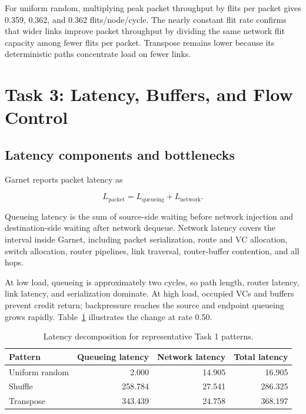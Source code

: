 \documentclass[11pt,a4paper]{article}
\begin{document}
For uniform random, multiplying peak packet throughput by flits per packet
gives 0.359, 0.362, and 0.362 flits/node/cycle. The nearly constant flit rate
confirms that wider links improve packet throughput by dividing the same
network flit capacity among fewer flits per packet. Transpose remains lower
because its deterministic paths concentrate load on fewer links.

\section{Task 3: Latency, Buffers, and Flow Control}

\subsection{Latency components and bottlenecks}

Garnet reports packet latency as

\begin{equation}
L_{\mathrm{packet}}=L_{\mathrm{queueing}}+L_{\mathrm{network}}.
\end{equation}

Queueing latency is the sum of source-side waiting before network injection
and destination-side waiting after network dequeue. Network latency covers the
interval inside Garnet, including packet serialization, route and VC
allocation, switch allocation, router pipelines, link traversal, router-buffer
contention, and all hops.

At low load, queueing is approximately two cycles, so path length, router
latency, link latency, and serialization dominate. At high load, occupied VCs
and buffers prevent credit return; backpressure reaches the source and endpoint
queueing grows rapidly. Table~\ref{tab:bottleneck} illustrates the change at
rate 0.50.

\begin{table}[H]
\centering
\caption{Latency decomposition for representative Task 1 patterns.}
\label{tab:bottleneck}
\begin{tabular}{lrrr}
\toprule
Pattern & Queueing latency & Network latency & Total latency \\
\midrule
Uniform random & 2.000 & 14.905 & 16.905 \\
Shuffle & 258.784 & 27.541 & 286.325 \\
Transpose & 343.439 & 24.758 & 368.197 \\
\bottomrule
\end{tabular}
\end{table}
\end{document}
